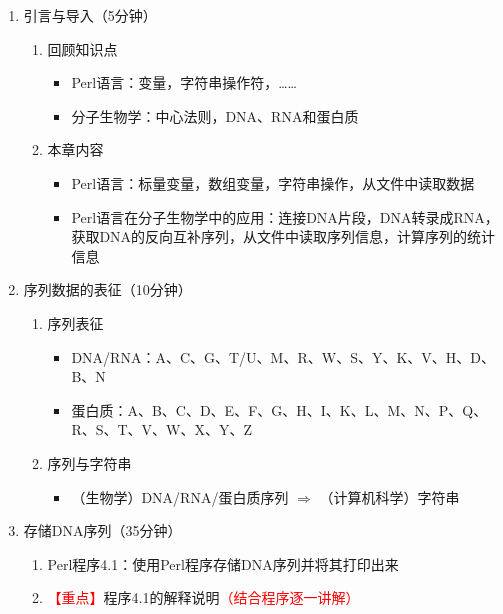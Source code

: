 \documentclass{TIJMUjiaoanLL}
\begin{document}
\firstTail

\newpage
\otherHeader

\begin{enumerate}
  \item 引言与导入（5分钟）
    \begin{enumerate}
      \item 回顾知识点
	\begin{itemize}
	  \item Perl语言：变量，字符串操作符，……
	  \item 分子生物学：中心法则，DNA、RNA和蛋白质
	\end{itemize}
      \item 本章内容
	\begin{itemize}
	  \item Perl语言：标量变量，数组变量，字符串操作，从文件中读取数据
	  \item Perl语言在分子生物学中的应用：连接DNA片段，DNA转录成RNA，获取DNA的反向互补序列，从文件中读取序列信息，计算序列的统计信息
	\end{itemize}
    \end{enumerate}
  \item 序列数据的表征（10分钟）
    \begin{enumerate}
      \item 序列表征
	\begin{itemize}
	  \item DNA/RNA：A、C、G、T/U、M、R、W、S、Y、K、V、H、D、B、N
	  \item 蛋白质：A、B、C、D、E、F、G、H、I、K、L、M、N、P、Q、R、S、T、V、W、X、Y、Z
	\end{itemize}
      \item 序列与字符串
	\begin{itemize}
	  \item （生物学）DNA/RNA/蛋白质序列 $\Longrightarrow$ （计算机科学）字符串
	\end{itemize}
    \end{enumerate}
  \item 存储DNA序列（35分钟）
    \begin{enumerate}
      \item Perl程序4.1：使用Perl程序存储DNA序列并将其打印出来 
      \item \textcolor{red}{【重点】}程序4.1的解释说明\textcolor{red}{（结合程序逐一讲解）}
\vspace*{-1em}
\begin{multicols}{2}

\end{multicols}
\end{enumerate}
\end{enumerate}
\end{document}
